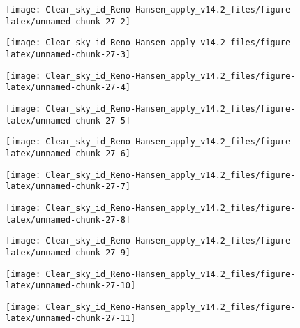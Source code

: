 \documentclass[
  10pt,
  a4paper,oneside]{article}
\begin{document}
\begin{center}\texttt{[image: Clear\_sky\_id\_Reno-Hansen\_apply\_v14.2\_files/figure-latex/unnamed-chunk-27-2]} \end{center}

\begin{center}\texttt{[image: Clear\_sky\_id\_Reno-Hansen\_apply\_v14.2\_files/figure-latex/unnamed-chunk-27-3]} \end{center}

\begin{center}\texttt{[image: Clear\_sky\_id\_Reno-Hansen\_apply\_v14.2\_files/figure-latex/unnamed-chunk-27-4]} \end{center}

\begin{center}\texttt{[image: Clear\_sky\_id\_Reno-Hansen\_apply\_v14.2\_files/figure-latex/unnamed-chunk-27-5]} \end{center}

\begin{center}\texttt{[image: Clear\_sky\_id\_Reno-Hansen\_apply\_v14.2\_files/figure-latex/unnamed-chunk-27-6]} \end{center}

\begin{center}\texttt{[image: Clear\_sky\_id\_Reno-Hansen\_apply\_v14.2\_files/figure-latex/unnamed-chunk-27-7]} \end{center}

\begin{center}\texttt{[image: Clear\_sky\_id\_Reno-Hansen\_apply\_v14.2\_files/figure-latex/unnamed-chunk-27-8]} \end{center}

\begin{center}\texttt{[image: Clear\_sky\_id\_Reno-Hansen\_apply\_v14.2\_files/figure-latex/unnamed-chunk-27-9]} \end{center}

\begin{center}\texttt{[image: Clear\_sky\_id\_Reno-Hansen\_apply\_v14.2\_files/figure-latex/unnamed-chunk-27-10]} \end{center}

\begin{center}\texttt{[image: Clear\_sky\_id\_Reno-Hansen\_apply\_v14.2\_files/figure-latex/unnamed-chunk-27-11]} \end{center}
\end{document}
